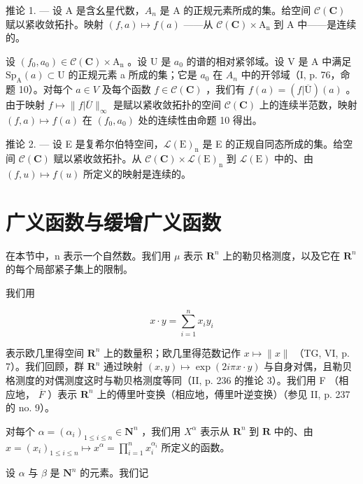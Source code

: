推论 1. --- 设 A 是含幺星代数，\(A_{n}\) 是 A 的正规元素所成的集。给空间 \(\mathcal{C}(\mathbf{C})\) 赋以紧收敛拓扑。映射 \((f,a)\mapsto f(a)\) ——从 \(\mathcal{C}(\mathbf{C})\times\mathrm{A}_{\mathrm{n}}\) 到 A 中——是连续的。

设 \((f_{0}, a_{0}) \in \mathcal{C}(\mathbf{C}) \times \mathrm{A}_{\mathrm{n}}\) 。设 U 是 \(a_{0}\) 的谱的相对紧邻域。设 V 是 A 中满足 \(\mathrm{Sp}_{\mathrm{A}}(a) \subset \mathrm{U}\) 的正规元素 a 所成的集；它是 \(a_{0}\) 在 \(A_{n}\) 中的开邻域（I, p. 76，命题 10）。对每个 \(a \in V\) 及每个函数 \(f \in \mathcal{C}(\mathbf{C})\) ，我们有 \(f(a) = (f|\overline{\mathrm{U}})(a)\) 。由于映射 \(f \mapsto \|f|\overline{U}\|_{\infty}\) 是赋以紧收敛拓扑的空间 \(\mathcal{C}(\mathbf{C})\) 上的连续半范数，映射 \((f, a) \mapsto f(a)\) 在 \((f_{0}, a_{0})\) 处的连续性由命题 10 得出。

推论 2. --- 设 E 是复希尔伯特空间，\(\mathcal{L}(\mathrm{E})_{\mathrm{n}}\) 是 E 的正规自同态所成的集。给空间 \(\mathcal{C}(\mathbf{C})\) 赋以紧收敛拓扑。从 \(\mathcal{C}(\mathbf{C}) \times \mathcal{L}(\mathrm{E})_{\mathrm{n}}\) 到 \(\mathcal{L}(\mathrm{E})\) 中的、由 \((f, u) \mapsto f(u)\) 所定义的映射是连续的。

\section{广义函数与缓增广义函数}

在本节中，n 表示一个自然数。我们用 \(\mu\) 表示 \(\mathbf{R}^{n}\) 上的勒贝格测度，以及它在 \(\mathbf{R}^{n}\) 的每个局部紧子集上的限制。

我们用

\[
x \cdot y = \sum_ {i = 1} ^ {n} x _ {i} y _ {i}
\]

表示欧几里得空间 \(\mathbf{R}^{n}\) 上的数量积；欧几里得范数记作 \(x \mapsto \|x\|\) （TG, VI, p. 7）。我们回顾，群 \(\mathbf{R}^{n}\) 通过映射 \((x, y) \mapsto \exp(2i\pi x \cdot y)\) 与自身对偶，且勒贝格测度的对偶测度这时与勒贝格测度等同（II, p. 236 的推论 3）。我们用 F （相应地， \(\overline{F}\) ）表示 \(\mathbf{R}^{n}\) 上的傅里叶变换（相应地，傅里叶逆变换）（参见 II, p. 237 的 no. 9）。

对每个 \(\alpha = (\alpha_{i})_{1\leqslant i\leqslant n}\in \mathbf{N}^{n}\) ，我们用 \(X^{\alpha}\) 表示从 \(\mathbf{R}^n\) 到 \(\mathbf{R}\) 中的、由 \(x = (x_{i})_{1\leqslant i\leqslant n}\mapsto x^{\alpha} = \prod_{i = 1}^{n}x_{i}^{\alpha_{i}}\) 所定义的函数。

设 \(\alpha\) 与 \(\beta\) 是 \(\mathbf{N}^n\) 的元素。我们记

